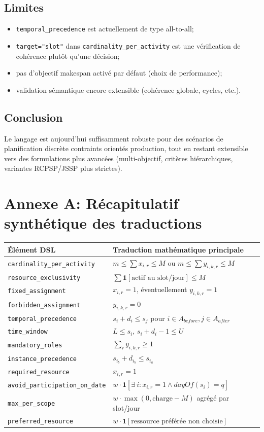 \documentclass[12pt,a4paper]{article}
\begin{document}
\subsection{Limites}
\begin{itemize}
  \item \texttt{temporal\_precedence} est actuellement de type all-to-all;
  \item \texttt{target="slot"} dans \texttt{cardinality\_per\_activity} est une vérification de cohérence plutôt qu'une décision;
  \item pas d'objectif makespan activé par défaut (choix de performance);
  \item validation sémantique encore extensible (cohérence globale, cycles, etc.).
\end{itemize}

\subsection{Conclusion}
Le langage est aujourd'hui suffisamment robuste pour des scénarios de planification discrète contraints orientés production, tout en restant extensible vers des formulations plus avancées (multi-objectif, critères hiérarchiques, variantes RCPSP/JSSP plus strictes).

\section{Annexe A: Récapitulatif synthétique des traductions}
\begin{center}
\begin{tabular}{@{}p{4.2cm}p{9.5cm}@{}}
\toprule
\textbf{Élément DSL} & \textbf{Traduction mathématique principale} \\
\midrule
\texttt{cardinality\_per\_activity} &
\(m \le \sum x_{i,r} \le M\) ou \(m \le \sum y_{i,k,r} \le M\) \\
\texttt{resource\_exclusivity} &
\(\sum \mathbf{1}[\text{actif au slot/jour}] \le M\) \\
\texttt{fixed\_assignment} &
\(x_{i,r}=1\), éventuellement \(y_{i,k,r}=1\) \\
\texttt{forbidden\_assignment} &
\(y_{i,k,r}=0\) \\
\texttt{temporal\_precedence} &
\(s_i+d_i \le s_j\) pour \(i\in A_{before}, j\in A_{after}\) \\
\texttt{time\_window} &
\(L \le s_i\), \(s_i+d_i-1 \le U\) \\
\texttt{mandatory\_roles} &
\(\sum_r y_{i,k,r}\ge 1\) \\
\texttt{instance\_precedence} &
\(s_{i_b}+d_{i_b}\le s_{i_a}\) \\
\texttt{required\_resource} &
\(x_{i,r}=1\) \\
\texttt{avoid\_participation\_on\_date} &
\(w\cdot \mathbf{1}[\exists\ i: x_{i,r}=1 \land dayOf(s_i)=q]\) \\
\texttt{max\_per\_scope} &
\(w\cdot \max(0,\text{charge}-M)\) agrégé par slot/jour \\
\texttt{preferred\_resource} &
\(w\cdot \mathbf{1}[\text{ressource préférée non choisie}]\) \\
\bottomrule
\end{tabular}
\end{center}
\end{document}
